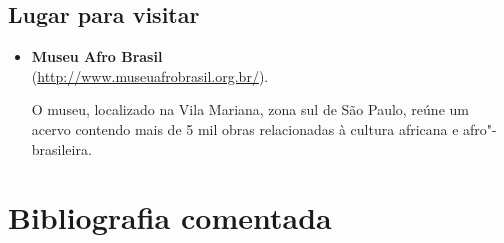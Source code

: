 \documentclass[12pt]{extarticle}
\begin{document}
\subsection{Lugar para visitar}

\begin{itemize}
\item\textbf{Museu Afro Brasil}\\
(\url{http://www.museuafrobrasil.org.br/}).

O museu, localizado na Vila Mariana, zona sul de São Paulo, reúne um
acervo contendo mais de 5 mil obras relacionadas à cultura africana e
afro"-brasileira.
\end{itemize}

\section{Bibliografia comentada}
\end{document}
